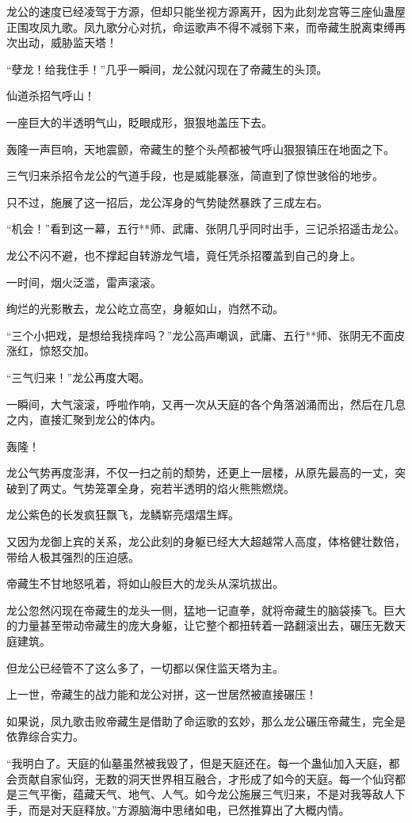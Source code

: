 \begin{this_body}
龙公的速度已经凌驾于方源，但却只能坐视方源离开，因为此刻龙宫等三座仙蛊屋正围攻凤九歌。凤九歌分心对抗，命运歌声不得不减弱下来，而帝藏生脱离束缚再次出动，威胁监天塔！

“孽龙！给我住手！”几乎一瞬间，龙公就闪现在了帝藏生的头顶。

仙道杀招气呼山！

一座巨大的半透明气山，眨眼成形，狠狠地盖压下去。

轰隆一声巨响，天地震颤，帝藏生的整个头颅都被气呼山狠狠镇压在地面之下。

三气归来杀招令龙公的气道手段，也是威能暴涨，简直到了惊世骇俗的地步。

只不过，施展了这一招后，龙公浑身的气势陡然暴跌了三成左右。

“机会！”看到这一幕，五行**师、武庸、张阴几乎同时出手，三记杀招遥击龙公。

龙公不闪不避，也不撑起自转游龙气墙，竟任凭杀招覆盖到自己的身上。

一时间，烟火泛滥，雷声滚滚。

绚烂的光影散去，龙公屹立高空，身躯如山，岿然不动。

“三个小把戏，是想给我挠痒吗？”龙公高声嘲讽，武庸、五行**师、张阴无不面皮涨红，惊怒交加。

“三气归来！”龙公再度大喝。

一瞬间，大气滚滚，呼啦作响，又再一次从天庭的各个角落汹涌而出，然后在几息之内，直接汇聚到龙公的体内。

轰隆！

龙公气势再度澎湃，不仅一扫之前的颓势，还更上一层楼，从原先最高的一丈，突破到了两丈。气势笼罩全身，宛若半透明的焰火熊熊燃烧。

龙公紫色的长发疯狂飘飞，龙鳞崭亮熠熠生辉。

又因为龙御上宾的关系，龙公此刻的身躯已经大大超越常人高度，体格健壮数倍，带给人极其强烈的压迫感。

帝藏生不甘地怒吼着，将如山般巨大的龙头从深坑拔出。

龙公忽然闪现在帝藏生的龙头一侧，猛地一记直拳，就将帝藏生的脑袋揍飞。巨大的力量甚至带动帝藏生的庞大身躯，让它整个都扭转着一路翻滚出去，碾压无数天庭建筑。

但龙公已经管不了这么多了，一切都以保住监天塔为主。

上一世，帝藏生的战力能和龙公对拼，这一世居然被直接碾压！

如果说，凤九歌击败帝藏生是借助了命运歌的玄妙，那么龙公碾压帝藏生，完全是依靠综合实力。

“我明白了。天庭的仙墓虽然被我毁了，但是天庭还在。每一个蛊仙加入天庭，都会贡献自家仙窍，无数的洞天世界相互融合，才形成了如今的天庭。每一个仙窍都是三气平衡，蕴藏天气、地气、人气。如今龙公施展三气归来，不是对我等敌人下手，而是对天庭释放。”方源脑海中思绪如电，已然推算出了大概内情。


\end{this_body}
